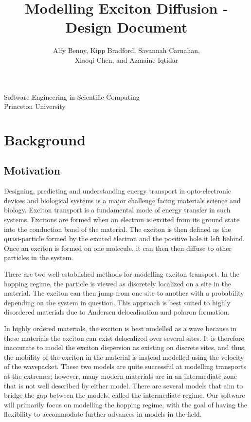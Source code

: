 \documentclass{article}
\title{Modelling Exciton Diffusion - Design Document}
\author{Alfy Benny, Kipp Bradford, Savannah Carnahan,\\ Xiaoqi Chen, and Azmaine Iqtidar}
\begin{document}
       \maketitle
      
       \vfill
            
       
            
      \vfill
     
       \begin{center}
            
       Software Engineering in Scientific Computing\\
       Princeton University\\
       
    \end{center}    
  
\newpage

\section{Background}

\subsection{Motivation}

Designing, predicting and understanding energy transport in opto-electronic devices and biological systems is a major challenge facing materials science and biology. Exciton transport is a fundamental mode of energy transfer in such systems. Excitons are formed when an electron is excited from its ground state into the conduction band of the material. The exciton is then defined as the quasi-particle formed by the excited electron and the positive hole it left behind. Once an exciton is formed on one molecule, it can then then diffuse to other particles in the system. 

There are two well-established methods for modelling exciton transport.\cite{Oberhofer2017ChargeMethods} In the hopping regime, the particle is viewed as discretely localized on a site in the material. The exciton can then jump from one site to another with a probability depending on the system in question. This approach is best suited to highly disordered materials due to Andersen delocalisation and polaron formation.\cite{DanielBalzer2021DelocalisedMaterials}

In highly ordered materials, the exciton is best modelled as a wave because in these materials the exciton can exist delocalized over several sites.\cite{Oberhofer2017ChargeMethods} It is therefore inaccurate to model the exciton dispersion as existing on discrete sites, and thus, the mobility of the exciton in the material is instead modelled using the velocity of the wavepacket. These two models are quite successful at modelling transports at the extremes; however, many modern materials are in an intermediate zone that is not well described by either model. There are several models that aim to bridge the gap between the models, called the intermediate regime. Our software will primarily focus on modelling the hopping regime, with the goal of having the flexibility to accommodate further advances in models in the field.
\end{document}
